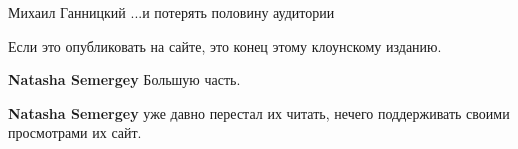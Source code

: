 \begin{itemize}
\begin{itemize}
Михаил Ганницкий ...и потерять половину аудитории

 
Если это опубликовать на сайте, это конец этому клоунскому изданию.

 
\textbf{Natasha Semergey}
Большую часть.

 
\textbf{Natasha Semergey} уже давно перестал их читать, нечего поддерживать своими просмотрами их сайт.
\end{itemize}

\end{itemize}

